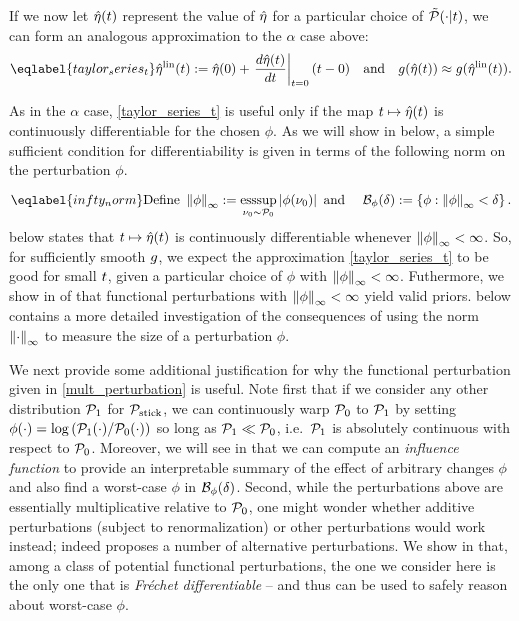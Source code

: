 If we now let $\hat\eta(t)$ represent the value of $\hat\eta$ for a particular
choice of $\tilde{\mathcal{P}}(\cdot \vert t)$, we can form an analogous approximation to the
$\alpha$ case above:
%
\begin{align} \eqlabel{taylor_series_t}
%
\etalin(\t) :=
    \etaopt(0) +
    \fracat{d\etaopt(t)}{dt}{\t=0} (\t - 0)
\mathand
g(\etaopt(\t)) \approx g(\etalin(\t)).
%
\end{align}

As in the $\alpha$ case, \eqref{taylor_series_t} is useful only if the map $t
\mapsto \hat\eta(t)$ is continuously differentiable for the chosen $\phi$.  As we
will show in  below, a simple sufficient condition for
differentiability is given in terms of the following norm on the perturbation
$\phi$.

\begin{equation} \eqlabel{infty_norm}
    \textrm{Define }
	\norminf{\phi} := \esssup_{\nu_0 \sim \pbase} \abs{\phi(\nu_0)}
    \textrm{ and }
	\quad \ball_\phi(\delta) := \left\{ \phi: \norminf{\phi} <
\delta \right\}.
\end{equation}
%
 below states that $t \mapsto \hat\eta(t)$ is continuously
differentiable whenever $\left\Vert\phi\right\Vert_{\infty} < \infty$.  So, for sufficiently smooth
$g$, we expect the approximation \eqref{taylor_series_t} to be good for small
$t$, given a particular choice of $\phi$ with $\left\Vert\phi\right\Vert_{\infty} < \infty$.
%
Futhermore, we show in  of
 that functional perturbations with
$\left\Vert\phi\right\Vert_{\infty} < \infty$ yield valid priors.   
below contains a more detailed investigation of the consequences of  using the
norm $\left\Vert\cdot\right\Vert_{\infty}$ to measure the size of a perturbation $\phi$.

We next provide some additional justification for why the functional
perturbation given in \eqref{mult_perturbation} is useful. Note first that if we
consider any other distribution $\mathcal{P}_{1}$ for $\mathcal{P}_{\mathrm{stick}}$, we can continuously warp
$\mathcal{P}_{0}$ to $\mathcal{P}_{1}$ by setting $\phi(\cdot) = \log \left( \mathcal{P}_{1}(\cdot) /
\mathcal{P}_{0}(\cdot) \right)$ so long as $\mathcal{P}_{1} \ll \mathcal{P}_{0}$, i.e.\ $\mathcal{P}_{1}$ is
absolutely continuous with respect to $\mathcal{P}_{0}$. Moreover, we will see in
 that we can compute an \emph{influence function} to
provide an interpretable summary of the effect of arbitrary changes $\phi$ and
also find a worst-case $\phi$ in $\mathcal{B}_\phi(\delta)$. Second, while the
perturbations above are essentially multiplicative relative to $\mathcal{P}_{0}$, one
might wonder whether additive perturbations (subject to renormalization) or
other perturbations would work instead; indeed \citet{gustafson:1996:local}
proposes a number of alternative perturbations. We show in
 that, among a class of potential functional
perturbations, the one we consider here is the only one that is {\em Fr{\'e}chet
differentiable} -- and thus can be used to safely reason about worst-case
$\phi$.

